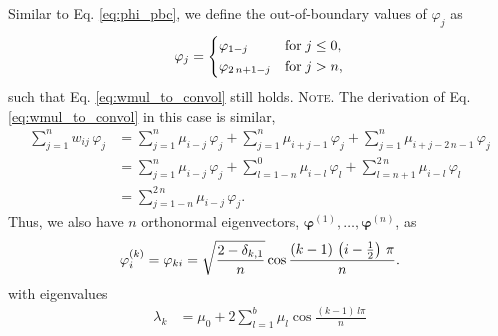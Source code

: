 \documentclass[reprint, floatfix]{revtex4-1}
\newcommand{\note}[1]{{\color{DarkGreen}\footnotesize \textsc{Note.} #1}}
\begin{document}
Similar to Eq. \eqref{eq:phi_pbc},
we define the out-of-boundary values
of $\varphi_j$ as
%
\begin{equation}
  \varphi_j
  =
  \begin{dcases}
    \varphi_{ 1 - j }           & \mathrm{for \;} j \le 0, \\
    \varphi_{ 2 \, n + 1 - j }  & \mathrm{for \;} j > n,
  \end{dcases}
\label{eq:phi_refl}
\end{equation}
%
such that Eq. \eqref{eq:wmul_to_convol}
still holds.
%
\note{The derivation of Eq. \eqref{eq:wmul_to_convol}
  in this case is similar,
  $$
  \begin{aligned}
    \sum_{j = 1}^n w_{ij} \, \varphi_j
    &=
    \sum_{j = 1}^n
      \mu_{i - j} \, \varphi_j
    +
    \sum_{j = 1}^n
      \mu_{i + j - 1} \, \varphi_j
    +
    \sum_{j = 1}^n
      \mu_{i + j - 2 \, n - 1} \, \varphi_j
    \\
    &=
    \sum_{j = 1}^n
      \mu_{i - j} \, \varphi_j
    +
    \sum_{l = 1 - n}^0
      \mu_{i - l} \, \varphi_l
    +
    \sum_{l = n + 1}^{ 2 \, n }
      \mu_{i - l} \, \varphi_l
    \\
    &=
    \sum_{j = 1 - n}^{ 2 \, n}
      \mu_{i - j} \, \varphi_j.
  \end{aligned}
  $$
}
%
Thus, we also have $n$ orthonormal eigenvectors,
$\pmb\varphi^{(1)}, \dots, \pmb\varphi^{(n)}$,
as
%
\begin{equation}
\varphi^{(k)}_i
=
\varphi_{k i}
=
\sqrt{
    \frac{ 2 - \delta_{k, 1} }
         {       n           }
     }
   \cos \frac{ ( k - 1) \, \left( i - \frac 1 2 \right) \, \pi}
            {                  n                         }.
\notag
\end{equation}
%
with eigenvalues
%
\begin{align}
  \lambda_k
  &=
  \mu_0
  +
  2
  \sum_{l = 1}^b
    \mu_l
    \cos \frac{(k - 1)  \, l \pi}{n}
  \label{eq:wband_eigenvalue_refl}
\end{align}
%
\end{document}
